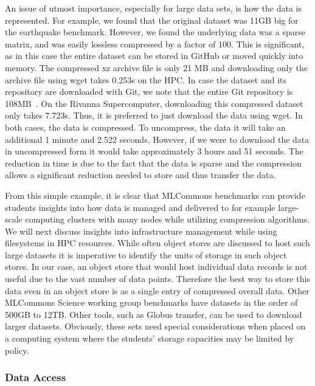 \documentclass[utf8]{FrontiersinVancouver} %
\begin{document}
An issue of utmost importance, especially for large data sets, is how the data is represented. For example, we found that the original dataset was 11GB big for the earthquake benchmark. However, we found the underlying data was a sparse matrix, and was easily lossless compressed by a factor of 100. This is significant, as in this case the entire dataset can be stored in GitHub or moved quickly into memory. The compressed xz archive file is only 21 MB and downloading only the archive file using wget takes 0.253s on the HPC. In case the dataset and its repository are downloaded with Git, we note that the entire Git repository is 108MB~\citep{eq-data}. On the Rivanna Supercomputer, downloading this compressed dataset only takes 7.723s. Thus, it is preferred to just download the data using wget. In both cases, the data is compressed. To uncompress, the data it will take an additional 1 minute and 2.522 seconds. However, if we were to download the data in uncompressed form it would take approximately 3 hours and 51 seconds. The reduction in time is due to the fact that the data is sparse and the compression allows a significant reduction needed to store and thus transfer the data.

From this simple example, it is clear that MLCommons benchmarks can provide students insights into how data is managed and delivered to for example large-scale computing clusters with many nodes while utilizing compression algorithms. We will next discuss insights into infrastructure management while using filesystems in HPC resources.  While often object stores are discussed to host such large datasets it is imperative to identify the units of storage in such object stores.  In our case, an object store that would host individual data records is not useful due to the vast number of data points. Therefore the best way to store this data even in an object store is as a single entry of compressed overall data.  Other MLCommons Science working group benchmarks have datasets in the order of 500GB to 12TB. Other tools, such as Globus transfer, can be used to download larger datasets.  Obviously, these sets need special considerations when placed on a computing system where the students' storage capacities may be limited by policy.


\subsubsection{Data Access}
\end{document}
